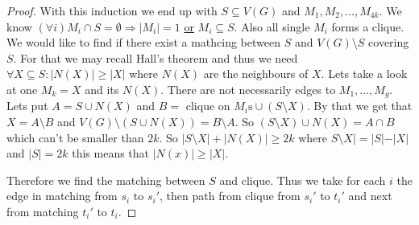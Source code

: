 \begin{proof}
	With this induction we end up with $S \subseteq V(G)$ and $M_{1}, M_{2}, \dots, M_{4k}$. We know $(\forall i) M_{i} \cap S = \emptyset \Rightarrow |M_{i}| =1$ \underline{or} $M_{i} \subseteq S$. Also all single $M_{i}$ forms a clique. We would like to find if there exist a mathcing between $S$ and $V(G) \setminus S$ covering $S$. For that we may recall Hall's theorem and thus we need $\forall X \subseteq S: |N(X)| \geq |X|$ where $N(X)$ are the neighbours of $X$. Lets take a look at one $M_{k} = X$ and its $N(X)$. There are not necessarily edges to $M_{1}, \dots, M_{g}$. Lets put $A = S \cup N(X)$ and $B = \text{ clique on } M_{i}\text{s} \cup (S \setminus X)$. By that we get that $X = A \setminus B$ and $V(G) \setminus (S \cup N(X)) = B \setminus A$. So $(S \setminus X) \cup N(X) = A \cap B$ which can't be smaller than $2k$. So $|S \setminus X| + |N(X)| \geq 2k$ where $S \setminus X| = |S| - |X|$ and $|S| = 2k$ this means that $|N(x)| \geq |X|$.
	
	Therefore we find the matching between $S$ and clique. Thus we take for each $i$ the edge in matching from $s_{i}$ to $s_{i}'$, then path from clique from $s_{i}'$ to $t_{i}'$ and next from matching $t_{i}'$ to $t_{i}$.
\end{proof}
